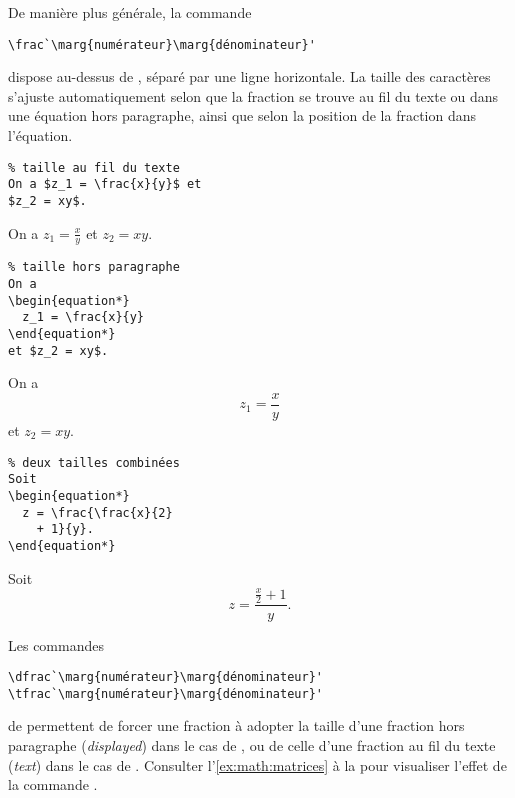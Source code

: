 De manière plus générale, la commande
\begin{lstlisting}
\frac`\marg{numérateur}\marg{dénominateur}'
\end{lstlisting}
dispose  au-dessus de , séparé par
une ligne horizontale. La taille des caractères s'ajuste
automatiquement selon que la fraction se trouve au fil du texte ou
dans une équation hors paragraphe, ainsi que selon la position de la
fraction dans l'équation.
\begin{demo}
  \begin{texample}
\begin{lstlisting}
% taille au fil du texte
On a $z_1 = \frac{x}{y}$ et
$z_2 = xy$.
\end{lstlisting}
    \producing On a $z_1 = \frac{x}{y}$ et $z_2 = xy$.
  \end{texample}

  \begin{texample}
\begin{lstlisting}
% taille hors paragraphe
On a
\begin{equation*}
  z_1 = \frac{x}{y}
\end{equation*}
et $z_2 = xy$.
\end{lstlisting}
    \producing On a
    \begin{equation*}
      z_1 = \frac{x}{y}
    \end{equation*}
    et $z_2 = xy$.
  \end{texample}

  \begin{texample}
\begin{lstlisting}
% deux tailles combinées
Soit
\begin{equation*}
  z = \frac{\frac{x}{2}
    + 1}{y}.
\end{equation*}
\end{lstlisting}
    \producing Soit
    \begin{equation*}
      z = \frac{\frac{x}{2} + 1}{y}.
    \end{equation*}
  \end{texample}
\end{demo}

Les commandes
\begin{lstlisting}
\dfrac`\marg{numérateur}\marg{dénominateur}'
\tfrac`\marg{numérateur}\marg{dénominateur}'
\end{lstlisting}
de  permettent de forcer une fraction à adopter la taille
d'une fraction hors paragraphe (\emph{displayed}) dans le cas de
\cmd{\dfrac}, ou de celle d'une fraction au fil du texte (\emph{text})
dans le cas de \cmd{\tfrac}. Consulter l'\autoref{ex:math:matrices} à
la  pour visualiser l'effet de la
commande \cmd{\dfrac}.

